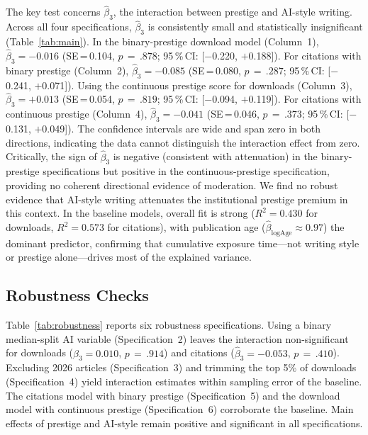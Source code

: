 \documentclass[12pt,a4paper]{article}
\begin{document}
The key test concerns $\hat{\beta}_3$, the interaction between prestige
and AI-style writing.
Across all four specifications, $\hat{\beta}_3$ is consistently small
and statistically insignificant (Table~\ref{tab:main}).
In the binary-prestige download model (Column~1),
$\hat{\beta}_3 = -0.016$ (SE\,=\,0.104, $p\,=\,.878$;
95\,\%\,CI: [$-$0.220, $+$0.188]).
For citations with binary prestige (Column~2),
$\hat{\beta}_3 = -0.085$ (SE\,=\,0.080, $p\,=\,.287$;
95\,\%\,CI: [$-$0.241, $+$0.071]).
Using the continuous prestige score for downloads (Column~3),
$\hat{\beta}_3 = +0.013$ (SE\,=\,0.054, $p\,=\,.819$;
95\,\%\,CI: [$-$0.094, $+$0.119]).
For citations with continuous prestige (Column~4),
$\hat{\beta}_3 = -0.041$ (SE\,=\,0.046, $p\,=\,.373$;
95\,\%\,CI: [$-$0.131, $+$0.049]).
The confidence intervals are wide and span zero in both directions,
indicating the data cannot distinguish the interaction effect from zero.
Critically, the sign of $\hat{\beta}_3$ is negative (consistent with
attenuation) in the binary-prestige specifications but positive in the
continuous-prestige specification, providing no coherent directional
evidence of moderation.
We find no robust evidence that AI-style writing attenuates the
institutional prestige premium in this context.
In the baseline models, overall fit is strong ($R^2 = 0.430$ for
downloads, $R^2 = 0.573$ for citations), with publication age
($\hat{\beta}_{\log\text{Age}}\approx 0.97$) the dominant predictor,
confirming that cumulative exposure time---not writing style or
prestige alone---drives most of the explained variance.

\subsection{Robustness Checks}

Table~\ref{tab:robustness} reports six robustness specifications.
Using a binary median-split AI variable (Specification~2) leaves
the interaction non-significant for downloads
($\hat{\beta}_3 = 0.010$, $p\,=\,.914$) and citations
($\hat{\beta}_3 = -0.053$, $p\,=\,.410$).
Excluding 2026 articles (Specification~3) and trimming the top 5\%
of downloads (Specification~4) yield interaction estimates within
sampling error of the baseline.
The citations model with binary prestige (Specification~5) and
the download model with continuous prestige (Specification~6)
corroborate the baseline.
Main effects of prestige and AI-style remain positive and significant
in all specifications.

\end{document}
